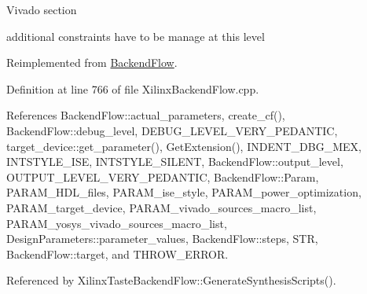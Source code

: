 Vivado section

additional constraints have to be manage at this level 

Reimplemented from \hyperlink{classBackendFlow_a367d9917dc257ed6aa0bb5e97f57d2d4}{Backend\+Flow}.



Definition at line 766 of file Xilinx\+Backend\+Flow.\+cpp.



References Backend\+Flow\+::actual\+\_\+parameters, create\+\_\+cf(), Backend\+Flow\+::debug\+\_\+level, D\+E\+B\+U\+G\+\_\+\+L\+E\+V\+E\+L\+\_\+\+V\+E\+R\+Y\+\_\+\+P\+E\+D\+A\+N\+T\+IC, target\+\_\+device\+::get\+\_\+parameter(), Get\+Extension(), I\+N\+D\+E\+N\+T\+\_\+\+D\+B\+G\+\_\+\+M\+EX, I\+N\+T\+S\+T\+Y\+L\+E\+\_\+\+I\+SE, I\+N\+T\+S\+T\+Y\+L\+E\+\_\+\+S\+I\+L\+E\+NT, Backend\+Flow\+::output\+\_\+level, O\+U\+T\+P\+U\+T\+\_\+\+L\+E\+V\+E\+L\+\_\+\+V\+E\+R\+Y\+\_\+\+P\+E\+D\+A\+N\+T\+IC, Backend\+Flow\+::\+Param, P\+A\+R\+A\+M\+\_\+\+H\+D\+L\+\_\+files, P\+A\+R\+A\+M\+\_\+ise\+\_\+style, P\+A\+R\+A\+M\+\_\+power\+\_\+optimization, P\+A\+R\+A\+M\+\_\+target\+\_\+device, P\+A\+R\+A\+M\+\_\+vivado\+\_\+sources\+\_\+macro\+\_\+list, P\+A\+R\+A\+M\+\_\+yosys\+\_\+vivado\+\_\+sources\+\_\+macro\+\_\+list, Design\+Parameters\+::parameter\+\_\+values, Backend\+Flow\+::steps, S\+TR, Backend\+Flow\+::target, and T\+H\+R\+O\+W\+\_\+\+E\+R\+R\+OR.



Referenced by Xilinx\+Taste\+Backend\+Flow\+::\+Generate\+Synthesis\+Scripts().

